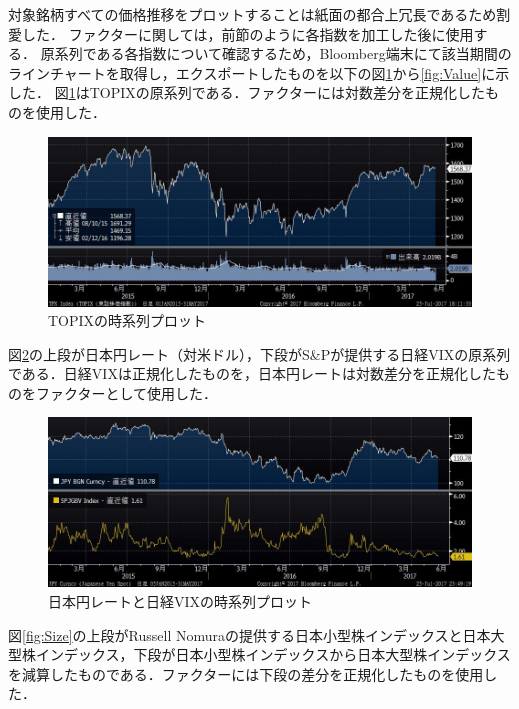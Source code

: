 ﻿\documentclass[11pt]{jreport}
\begin{document}
対象銘柄すべての価格推移をプロットすることは紙面の都合上冗長であるため割愛した．
ファクターに関しては，前節のように各指数を加工した後に使用する．
原系列である各指数について確認するため，Bloomberg端末にて該当期間のラインチャートを取得し，エクスポートしたものを以下の図\ref{fig:TOPIX}から\ref{fig:Value}に示した．
図\ref{fig:TOPIX}はTOPIXの原系列である．ファクターには対数差分を正規化したものを使用した．
\begin{figure}[H]
	\begin{center}
		\includegraphics[width=15cm]{./fig/TOPIX.jpg}
		\caption{TOPIXの時系列プロット}
		\label{fig:TOPIX}
	\end{center}
\end{figure}
図\ref{fig:VIX_JPY}の上段が日本円レート（対米ドル），下段がS\&Pが提供する日経VIXの原系列である．日経VIXは正規化したものを，日本円レートは対数差分を正規化したものをファクターとして使用した．
\begin{figure}[H]
	\begin{center}
		\includegraphics[width=15cm]{./fig/VIX_JPY.jpg}
		\caption{日本円レートと日経VIXの時系列プロット}
		\label{fig:VIX_JPY}
	\end{center}
\end{figure}
図\ref{fig:Size}の上段がRussell Nomuraの提供する日本小型株インデックスと日本大型株インデックス，下段が日本小型株インデックスから日本大型株インデックスを減算したものである．ファクターには下段の差分を正規化したものを使用した．
\end{document}
